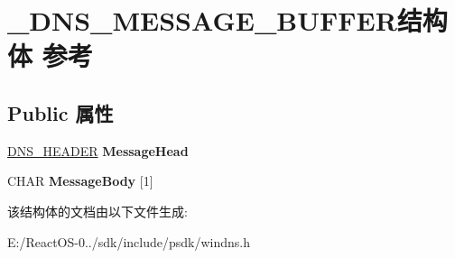 \hypertarget{struct___d_n_s___m_e_s_s_a_g_e___b_u_f_f_e_r}{}\section{\+\_\+\+D\+N\+S\+\_\+\+M\+E\+S\+S\+A\+G\+E\+\_\+\+B\+U\+F\+F\+E\+R结构体 参考}
\label{struct___d_n_s___m_e_s_s_a_g_e___b_u_f_f_e_r}
\subsection*{Public 属性}
\begin{DoxyCompactItemize}
\item 
\mbox{\label{struct___d_n_s___m_e_s_s_a_g_e___b_u_f_f_e_r_a89010f15361b899d74956bbc130378d1}} 
\hyperlink{struct___d_n_s___h_e_a_d_e_r}{D\+N\+S\+\_\+\+H\+E\+A\+D\+ER} {\bfseries Message\+Head}
\item 
\mbox{\label{struct___d_n_s___m_e_s_s_a_g_e___b_u_f_f_e_r_a6d114c7cd5ecb6c552ff9a6a9bccea3d}} 
C\+H\+AR {\bfseries Message\+Body} \mbox{[}1\mbox{]}
\end{DoxyCompactItemize}


该结构体的文档由以下文件生成\+:\begin{DoxyCompactItemize}
\item 
E\+:/\+React\+O\+S-\/0../sdk/include/psdk/windns.\+h\end{DoxyCompactItemize}
